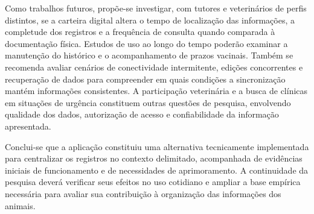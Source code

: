 \documentclass{UNESC}
\begin{document}
Como trabalhos futuros, propõe-se investigar, com tutores e veterinários de perfis distintos, se a carteira digital altera o tempo de localização das informações, a completude dos registros e a frequência de consulta quando comparada à documentação física. Estudos de uso ao longo do tempo poderão examinar a manutenção do histórico e o acompanhamento de prazos vacinais. Também se recomenda avaliar cenários de conectividade intermitente, edições concorrentes e recuperação de dados para compreender em quais condições a sincronização mantém informações consistentes. A participação veterinária e a busca de clínicas em situações de urgência constituem outras questões de pesquisa, envolvendo qualidade dos dados, autorização de acesso e confiabilidade da informação apresentada.

Conclui-se que a aplicação constituiu uma alternativa tecnicamente implementada para centralizar os registros no contexto delimitado, acompanhada de evidências iniciais de funcionamento e de necessidades de aprimoramento. A continuidade da pesquisa deverá verificar seus efeitos no uso cotidiano e ampliar a base empírica necessária para avaliar sua contribuição à organização das informações dos animais.


\renewcommand{\refname}{REFERÊNCIAS}
\end{document}
